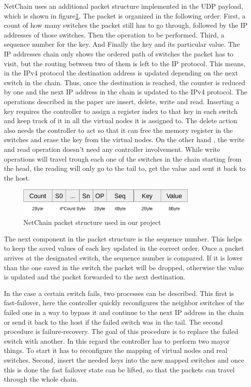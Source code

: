 \documentclass[11pt,oneside,a4paper]{article}
\begin{document}
NetChain uses an additional packet structure implemented in the UDP payload, which is shown in figure\ref{fig:netchainpkt}. The packet is organized in the following order: First, a count of how many switches the packet still has to go through, followed by the IP addresses of those switches. Then the operation to be performed. Third, a sequence number for the key. And Finally the key  and its particular value. The IP addresses chain only shows the ordered path of switches the packet has to visit, but the routing between two of them is left to the IP protocol. This means, in the IPv4 protocol the destination address is updated depending on the next switch in the chain. Thus, once the destination is reached, the counter is reduced by one and the next IP address in the chain is updated to the IPv4 protocol. The operations described in the paper are insert, delete, write and read. Inserting a key requires the controller to assign a register index to that key in each switch and keep track of it in all the virtual nodes it is assigned to. The delete action also needs the controller to act so that it can free the memory register in the switches and erase the key from the virtual nodes. On the other hand , the write and read operation doesn't need any controller involvement. While write operations will travel trough each one of the switches in the chain starting from the head, the reading will only go to the tail to, get the value and sent it back to the host.

\begin{figure}[h]
    \centering
    \includegraphics[width=0.8\textwidth]{figures/NetChain-packet.png}
    \caption{NetChain packet structure used in our project}
    \label{fig:netchainpkt}
\end{figure}

The next component in the packet structure is the sequence number. This helps to keep the saved values of each key updated in the correct order. Once a packet arrives at the designated switch, the sequence number is compared. If it is lower than the one saved in the switch the packet will be dropped, otherwise the value is updated and the packet forwarded to the next destination.

In the case a certain switch fails, two processes can be described. This first is fast-failover, here the controller quickly reconfigures the neighbor switches of the failed one in a way to bypass it and continue to the next IP address in the chain or send it back to the host if the failed switch was in the tail. The second procedure is failure-recovery. The goal of this procedure is to replace the failed switch with another. In this regard the controller has to perform two mayor things. To start it has to reconfigure the mapping of virtual nodes and real switches. Second, insert the needed keys into the new mapped switches and once this is done the fast failover state can be lifted, so that the packets can travel through the whole chain.
\end{document}
